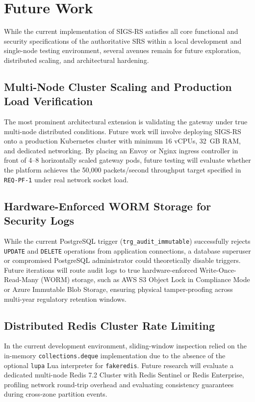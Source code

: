 \section{Future Work}

While the current implementation of SIGS-RS satisfies all core functional and security specifications of the authoritative SRS within a local development and single-node testing environment, several avenues remain for future exploration, distributed scaling, and architectural hardening.

\subsection{Multi-Node Cluster Scaling and Production Load Verification}
The most prominent architectural extension is validating the gateway under true multi-node distributed conditions. Future work will involve deploying SIGS-RS onto a production Kubernetes cluster with minimum 16 vCPUs, 32~GB RAM, and dedicated networking. By placing an Envoy or Nginx ingress controller in front of 4--8 horizontally scaled gateway pods, future testing will evaluate whether the platform achieves the 50,000 packets/second throughput target specified in \texttt{REQ-PF-1} under real network socket load.

\subsection{Hardware-Enforced WORM Storage for Security Logs}
While the current PostgreSQL trigger (\texttt{trg\_audit\_immutable}) successfully rejects \texttt{UPDATE} and \texttt{DELETE} operations from application connections, a database superuser or compromised PostgreSQL administrator could theoretically disable triggers. Future iterations will route audit logs to true hardware-enforced Write-Once-Read-Many (WORM) storage, such as AWS S3 Object Lock in Compliance Mode or Azure Immutable Blob Storage, ensuring physical tamper-proofing across multi-year regulatory retention windows.

\subsection{Distributed Redis Cluster Rate Limiting}
In the current development environment, sliding-window inspection relied on the in-memory \texttt{collections.deque} implementation due to the absence of the optional \texttt{lupa} Lua interpreter for \texttt{fakeredis}. Future research will evaluate a dedicated multi-node Redis 7.2 Cluster with Redis Sentinel or Redis Enterprise, profiling network round-trip overhead and evaluating consistency guarantees during cross-zone partition events.


